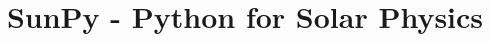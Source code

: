 \documentclass[12pt]{iopart}
\begin{document}
\title{SunPy - Python for Solar Physics}





\maketitle













%


{}
\end{document}
